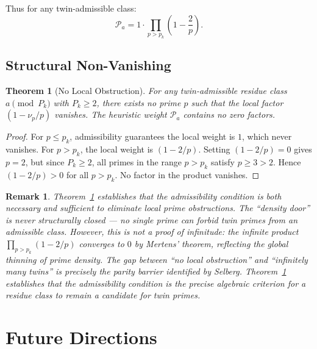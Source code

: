 \documentclass[11pt]{article}
\newtheorem{theorem}{Theorem}
\newtheorem{remark}{Remark}
\begin{document}
Thus for any twin-admissible class:
\begin{equation}
    \mathcal{P}_a = 1 \cdot \prod_{p > p_k} \left(1 - \frac{2}{p}\right).
\end{equation}

\subsection{Structural Non-Vanishing}

\begin{theorem}[No Local Obstruction]
\label{thm:nonvanish}
For any twin-admissible residue class $a \pmod{P_k}$ with $P_k \geq 2$, there exists no
prime $p$ such that the local factor $(1 - \nu_p/p)$ vanishes. The heuristic weight
$\mathcal{P}_a$ contains no zero factors.
\end{theorem}

\begin{proof}
For $p \leq p_k$, admissibility guarantees the local weight is $1$, which never vanishes.
For $p > p_k$, the local weight is $(1 - 2/p)$. Setting $(1 - 2/p) = 0$ gives $p = 2$,
but since $P_k \geq 2$, all primes in the range $p > p_k$ satisfy $p \geq 3 > 2$. Hence
$(1 - 2/p) > 0$ for all $p > p_k$. No factor in the product vanishes.
\end{proof}

\begin{remark}
Theorem~\ref{thm:nonvanish} establishes that the admissibility condition is both
necessary and sufficient to eliminate local prime obstructions. The ``density door''
is never structurally closed --- no single prime can forbid twin primes from an
admissible class. However, this is not a proof of infinitude: the infinite product
$\prod_{p > p_k} (1 - 2/p)$ converges to $0$ by Mertens' theorem, reflecting the
global thinning of prime density. The gap between ``no local obstruction'' and
``infinitely many twins'' is precisely the parity barrier identified by Selberg.
Theorem~\ref{thm:nonvanish} establishes that the admissibility condition is the precise algebraic criterion for a residue class to remain a candidate for twin primes.
\end{remark}

\section{Future Directions}
\label{sec:future}
\end{document}
